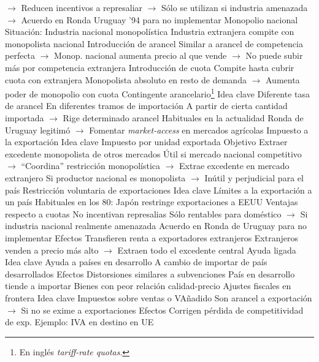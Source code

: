 \documentclass{nuevotema}
\begin{document}
\begin{esquemal}
				\4[] $\to$ Reducen incentivos a represaliar
				\4[] $\to$ Sólo se utilizan si industria amenazada
				\4[] $\to$ Acuerdo en Ronda Uruguay '94 para no implementar
			\3 Monopolio nacional
				\4 Situación:
				\4[] Industria nacional monopolística
				\4[] Industria extranjera compite con monopolista nacional
				\4 Introducción de arancel
				\4[] Similar a arancel de competencia perfecta
				\4[] $\to$ Monop. nacional aumenta precio al que vende
				\4[] $\to$ No puede subir más por competencia extranjera
				\4 Introducción de cuota
				\4[] Compite hasta cubrir cuota con extranjera
				\4[] Monopolista absoluto en resto de demanda
				\4[] $\to$ Aumenta poder de monopolio con cuota
		\2 Contingente arancelario\footnote{En inglés \textit{tariff-rate quotas}.}
			\3 Idea clave
				\4 Diferente tasa de arancel
				\4[] En diferentes tramos de importación
				\4 A partir de cierta cantidad importada
				\4[] $\to$ Rige determinado arancel
				\4 Habituales en la actualidad
				\4[] Ronda de Uruguay legitimó
				\4[] $\to$ Fomentar \textit{market-access} en mercados agrícolas
		\2 Impuesto a la exportación
			\3 Idea clave
				\4 Impuesto por unidad exportada
				\4 Objetivo
				\4[] Extraer excedente monopolista de otros mercados
				\4 Útil si mercado nacional competitivo
				\4[] $\to$ ``Coordina'' restricción monopolística
				\4[] $\to$ Extrae excedente en mercado extranjero
				\4 Si productor nacional es monopolista
				\4[] $\to$ Inútil y perjudicial para el país
		\2 Restricción voluntaria de exportaciones
			\3 Idea clave
				\4 Límites a la exportación a un país
				\4 Habituales en los 80:
				\4[] Japón restringe exportaciones a EEUU
				\4 Ventajas respecto a cuotas
				\4[] No incentivan represalias
				\4[] Sólo rentables para doméstico
				\4[] $\to$ Si industria nacional realmente amenazada
				\4 Acuerdo en Ronda de Uruguay para no implementar
			\3 Efectos
				\4 Transfieren renta a exportadores extranjeros
				\4[] Extranjeros venden a precio más alto
				\4[] $\to$ Extraen todo el excedente central
		\2 Ayuda ligada
			\3 Idea clave
				\4 Ayuda a países en desarrollo
				\4[] A cambio de importar de país desarrollados
			\3 Efectos
				\4 Distorsiones similares a subvenciones
				\4 País en desarrollo tiende a importar
				\4[] Bienes con peor relación calidad-precio
		\2 Ajustes fiscales en frontera
			\3 Idea clave
				\4 Impuestos sobre ventas o VAñadido
				\4[] Son arancel a exportación
				\4[] $\to$ Si no se exime a exportaciones
			\3 Efectos
				\4 Corrigen pérdida de competitividad de exp.
				\4 Ejemplo:
				\4[] IVA en destino en UE

\end{esquemal}
\end{document}
